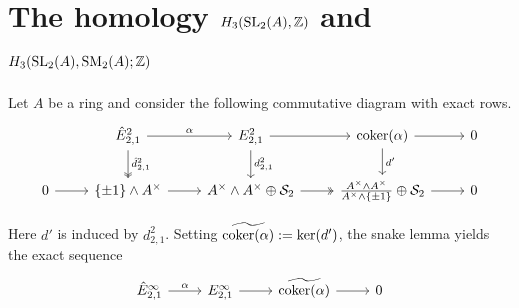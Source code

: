 \documentclass[11pt]{amsart}
\theoremstyle{definition}
\theoremstyle{plain}
\theoremstyle{definition}
\numberwithin{equation}{section}
\newcommand{\z}{\mathbb{Z}}
\renewcommand{\SS}{\mathcal{S}}
\renewcommand{\aa}{{A^\times}}
\newcommand{\SL}{\mathit{{\rm SL}}}
\newcommand{\SM}{\mathit{{\rm SM}}}
\newcommand{\coker}{{\rm coker}}
\begin{document}
	\section{The homology \texorpdfstring{$H_3(\SL_2(A),\z)$ and $H_3(\SL_2(A),\SM_2(A);\z)$}{H3(SL2(A),z) and H3(SL2(A),SM2(A);z)}}
	Let $A$ be a ring and consider the following commutative diagram with exact rows.
	\begin{equation}
		\begin{tikzcd}
			& \hat{E}^2_{2,1}\ar[r,"\alpha"]\ar[d,twoheadrightarrow,"\hat{d}^2_{2,1}"] & E^2_{2,1}\ar[r]\ar[d,"d^2_{2,1}"] & \coker(\alpha) \ar[r] \ar[d,"d'"] & 0\\
			0 \ar[r] & \{\pm 1\}\wedge\aa\ar[r] & \aa\wedge\aa\oplus\SS_2 \ar[r,twoheadrightarrow] & \frac{\aa\wedge\aa}{\aa\wedge\{\pm 1\}}\oplus\SS_2 \ar[r]& 0 
		\end{tikzcd}
	\end{equation}
	
	Here $d'$ is induced by $d^2_{2,1}$. Setting $\widetilde{\coker(\alpha)}:=\ker(d')$, the snake lemma yields the exact sequence
	\begin{equation}
		\label{alph-inf}
		\begin{tikzcd}
			\hat{E}^{\infty}_{2,1}\ar[r,"\alpha"] & E^{\infty}_{2,1}\ar[r] & \widetilde{\coker(\alpha)} \ar[r] & 0
		\end{tikzcd}
	\end{equation}
	
\end{document}

